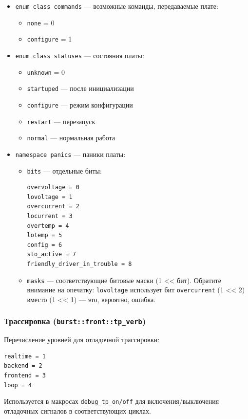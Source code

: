 \documentclass[a4paper,12pt]{article}
\begin{document}
\begin{itemize}
    \item \texttt{enum class commands} — возможные команды, передаваемые плате:
        \begin{itemize}
            \item \texttt{none} = 0
            \item \texttt{configure} = 1
        \end{itemize}
    \item \texttt{enum class statuses} — состояния платы:
        \begin{itemize}
            \item \texttt{unknown} = 0
            \item \texttt{startuped} — после инициализации
            \item \texttt{configure} — режим конфигурации
            \item \texttt{restart} — перезапуск
            \item \texttt{normal} — нормальная работа
        \end{itemize}
    \item \texttt{namespace panics} — паники платы:
        \begin{itemize}
            \item \texttt{bits} — отдельные биты:
                \begin{lstlisting}[caption={Board panic bits}]
overvoltage = 0
lovoltage = 1
overcurrent = 2
locurrent = 3
overtemp = 4
lotemp = 5
config = 6
sto_active = 7
friendly_driver_in_trouble = 8
                \end{lstlisting}
            \item \texttt{masks} — соответствующие битовые маски (1 << бит). Обратите внимание на опечатку: \texttt{lovoltage} использует бит \texttt{overcurrent} (1 << 2) вместо (1 << 1) — это, вероятно, ошибка.
        \end{itemize}
\end{itemize}

\subsubsection{Трассировка (\texttt{burst::front::tp\_verb})}

Перечисление уровней для отладочной трассировки:
\begin{lstlisting}[caption={Trace verbosity levels}]
realtime = 1
backend = 2
frontend = 3
loop = 4
\end{lstlisting}
Используется в макросах \texttt{debug\_tp\_on/off} для включения/выключения отладочных сигналов в соответствующих циклах.
\end{document}
